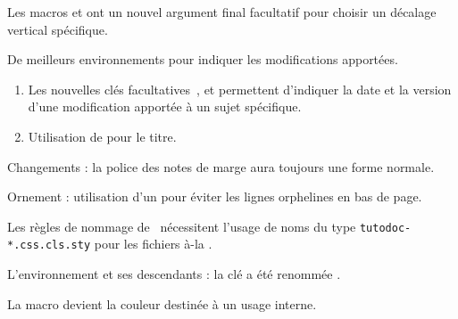 \tdocsep




\begin{tdocnew}[version = 1.6.2, date = 2024-10-30]
	\item Les macros  et  ont un nouvel argument final facultatif  pour choisir un décalage vertical spécifique.

	\item De meilleurs environnements pour indiquer les modifications apportées.
	\begin{enumerate}
		\item Les nouvelles clés facultatives \,,  et  permettent d'indiquer la date et la version d'une modification apportée à un sujet spécifique.

		\item Utilisation de  pour le titre.
	\end{enumerate}
\end{tdocnew}


\begin{tdocupdate}
	\item Changements : la police des notes de marge aura toujours une forme normale.

	\item Ornement : utilisation d'un \tdoclatexin{\cleaders} pour éviter les lignes orphelines en bas de page.
\end{tdocupdate}

\tdocsep




\begin{tdoctech}[version = 1.6.1, date = 2024-10-28]
    \item Les règles de nommage de \ctan\ nécessitent l'usage de noms du type \verb+tutodoc-*.css.cls.sty+ pour les fichiers à-la .
\end{tdoctech}

\tdocsep




\begin{tdocbreak}[version = 1.6.0, date = 2024-10-27]
    \item L'environnement  et ses descendants : la clé  a été renommée .

    \item La macro  devient la couleur  destinée à un usage interne.
\end{tdocbreak}


